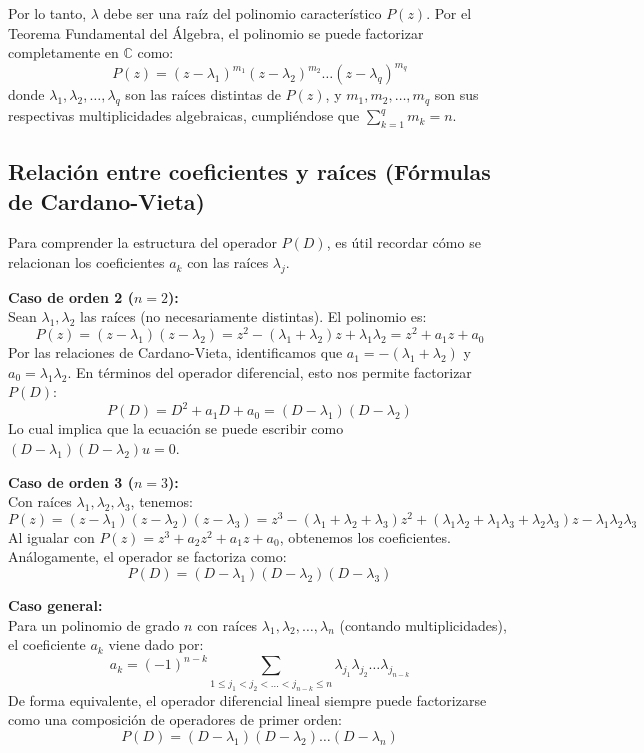 Por lo tanto, $\lambda$ debe ser una raíz del polinomio característico $P(z)$. Por el Teorema Fundamental del Álgebra, el polinomio se puede factorizar completamente en $\mathbb{C}$ como:
\[
    P(z) = (z - \lambda_1)^{m_1} (z - \lambda_2)^{m_2} \dots (z - \lambda_q)^{m_q}
\]
donde $\lambda_1, \lambda_2, \dots, \lambda_q$ son las raíces distintas de $P(z)$, y $m_1, m_2, \dots, m_q$ son sus respectivas multiplicidades algebraicas, cumpliéndose que $\sum_{k=1}^q m_k = n$.

\subsection{Relación entre coeficientes y raíces (Fórmulas de Cardano-Vieta)}

Para comprender la estructura del operador $P(D)$, es útil recordar cómo se relacionan los coeficientes $a_k$ con las raíces $\lambda_j$. 

\textbf{Caso de orden 2 ($n=2$):}\\
Sean $\lambda_1, \lambda_2$ las raíces (no necesariamente distintas). El polinomio es:
\[
    P(z) = (z - \lambda_1)(z - \lambda_2) = z^2 - (\lambda_1 + \lambda_2)z + \lambda_1 \lambda_2 = z^2 + a_1 z + a_0
\]
Por las relaciones de Cardano-Vieta, identificamos que $a_1 = -(\lambda_1 + \lambda_2)$ y $a_0 = \lambda_1 \lambda_2$.
En términos del operador diferencial, esto nos permite factorizar $P(D)$:
\[
    P(D) = D^2 + a_1 D + a_0 = (D - \lambda_1)(D - \lambda_2)
\]
Lo cual implica que la ecuación se puede escribir como $(D-\lambda_1)(D-\lambda_2) u = 0$.

\textbf{Caso de orden 3 ($n=3$):}\\
Con raíces $\lambda_1, \lambda_2, \lambda_3$, tenemos:
\[
    P(z) = (z - \lambda_1)(z - \lambda_2)(z - \lambda_3) = z^3 - (\lambda_1 + \lambda_2 + \lambda_3) z^2 + (\lambda_1 \lambda_2 + \lambda_1 \lambda_3 + \lambda_2 \lambda_3) z - \lambda_1 \lambda_2 \lambda_3
\]
Al igualar con $P(z) = z^3 + a_2 z^2 + a_1 z + a_0$, obtenemos los coeficientes. Análogamente, el operador se factoriza como:
\[
    P(D) = (D - \lambda_1)(D - \lambda_2)(D - \lambda_3)
\]

\textbf{Caso general:}\\
Para un polinomio de grado $n$ con raíces $\lambda_1, \lambda_2, \dots, \lambda_n$ (contando multiplicidades), el coeficiente $a_k$ viene dado por:
\[
    a_k = (-1)^{n-k} \sum_{1 \leq j_1 < j_2 < \dots < j_{n-k} \leq n} \lambda_{j_1} \lambda_{j_2} \dots \lambda_{j_{n-k}}
\]
De forma equivalente, el operador diferencial lineal siempre puede factorizarse como una composición de operadores de primer orden:
\[
    P(D) = (D - \lambda_1)(D - \lambda_2) \dots (D - \lambda_n)
\]

